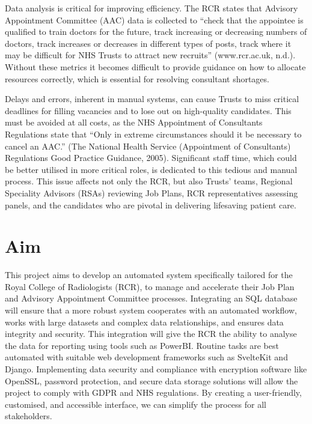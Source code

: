 Data analysis is critical for improving efficiency. The RCR states that Advisory Appointment Committee (AAC) data is collected to “check that the appointee is qualified to train doctors for the future, track increasing or decreasing numbers of doctors, track increases or decreases in different types of posts, track where it may be difficult for NHS Trusts to attract new recruits” (www.rcr.ac.uk, n.d.). Without these metrics it becomes difficult to provide guidance on how to allocate resources correctly, which is essential for resolving consultant shortages.

Delays and errors, inherent in manual systems, can cause Trusts to miss critical deadlines for filling vacancies and to lose out on high-quality candidates. This must be avoided at all costs, as the NHS Appointment of Consultants Regulations state that “Only in extreme circumstances should it be necessary to cancel an AAC.” (The National Health Service (Appointment of Consultants) Regulations Good Practice Guidance, 2005). Significant staff time, which could be better utilised in more critical roles, is dedicated to this tedious and manual process. This issue affects not only the RCR, but also Trusts’ teams, Regional Speciality Advisors (RSAs) reviewing Job Plans, RCR representatives assessing panels, and the candidates who are pivotal in delivering lifesaving patient care.
\section{Aim}
This project aims to develop an automated system specifically tailored for the Royal College of Radiologists (RCR), to manage and accelerate their Job Plan and Advisory Appointment Committee processes. Integrating an SQL database will ensure that a more robust system cooperates with an automated workflow, works with large datasets and complex data relationships, and ensures data integrity and security. This integration will give the RCR the ability to analyse the data for reporting using tools such as PowerBI. Routine tasks are best automated with suitable web development frameworks such as SvelteKit and Django. Implementing data security and compliance with encryption software like OpenSSL, password protection, and secure data storage solutions will allow the project to comply with GDPR and NHS regulations. By creating a user-friendly, customised, and accessible interface, we can simplify the process for all stakeholders.